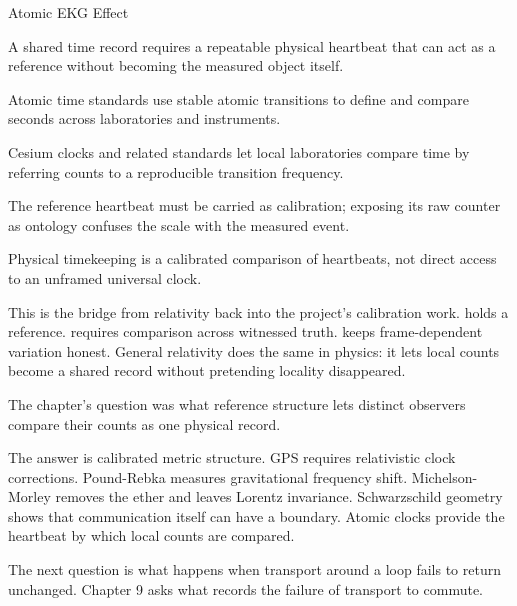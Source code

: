 \begin{phenom}{Atomic EKG Effect}
\label{ph:atomic-ekg-effect}

\PhStatement A shared time record requires a repeatable physical heartbeat that
can act as a reference without becoming the measured object itself.

\PhOrigin Atomic time standards use stable atomic transitions to define and
compare seconds across laboratories and instruments.

\PhObservation Cesium clocks and related standards let local laboratories
compare time by referring counts to a reproducible transition frequency.

\PhConstraint The reference heartbeat must be carried as calibration; exposing
its raw counter as ontology confuses the scale with the measured event.

\PhConsequence Physical timekeeping is a calibrated comparison of heartbeats,
not direct access to an unframed universal clock.

\end{phenom}

This is the bridge from relativity back into the project's calibration work.
 holds a reference.  requires comparison across witnessed
truth.  keeps frame-dependent variation honest. General relativity
does the same in physics: it lets local counts become a shared record without
pretending locality disappeared.

\begin{bridge}

The chapter's question was what reference structure lets distinct observers
compare their counts as one physical record.

The answer is calibrated metric structure. GPS requires relativistic clock
corrections. Pound-Rebka measures gravitational frequency shift. Michelson-
Morley removes the ether and leaves Lorentz invariance. Schwarzschild geometry
shows that communication itself can have a boundary. Atomic clocks provide the
heartbeat by which local counts are compared.

The next question is what happens when transport around a loop fails to return
unchanged. Chapter 9 asks what records the failure of transport to commute.

\end{bridge}

